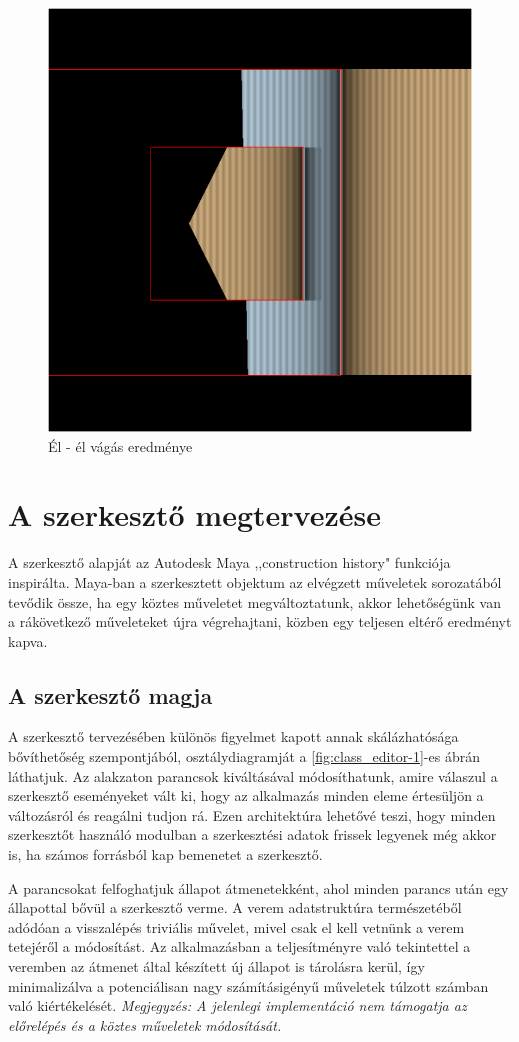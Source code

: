 \begin{figure}[H]
	\centering
	\includegraphics[width=.55\linewidth]{images/segment_segment_cut.png}
	\caption{Él - él vágás eredménye}
	\label{fig:segment_segment_cut-1}
\end{figure}

\section{A szerkesztő megtervezése}
A szerkesztő alapját az Autodesk Maya ,,construction history" funkciója inspirálta. Maya-ban a szerkesztett objektum az elvégzett műveletek sorozatából tevődik össze, ha egy köztes műveletet megváltoztatunk, akkor lehetőségünk van a rákövetkező műveleteket újra végrehajtani, közben egy teljesen eltérő eredményt kapva.

\subsection{A szerkesztő magja}

A szerkesztő tervezésében különös figyelmet kapott annak skálázhatósága bővíthetőség szempontjából, osztálydiagramját a \ref{fig:class_editor-1}-es ábrán láthatjuk. Az alakzaton parancsok kiváltásával módosíthatunk, amire válaszul a szerkesztő eseményeket vált ki, hogy az alkalmazás minden eleme értesüljön a változásról és reagálni tudjon rá. Ezen architektúra lehetővé teszi, hogy minden szerkesztőt használó modulban a szerkesztési adatok frissek legyenek még akkor is, ha számos forrásból kap bemenetet a szerkesztő.

A parancsokat felfoghatjuk állapot átmenetekként, ahol minden parancs után egy állapottal bővül a szerkesztő verme. A verem adatstruktúra természetéből adódóan a visszalépés triviális művelet, mivel csak el kell vetnünk a verem tetejéről a módosítást. Az alkalmazásban a teljesítményre való tekintettel a veremben az átmenet által készített új állapot is tárolásra kerül, így minimalizálva a potenciálisan nagy számításigényű műveletek túlzott számban való kiértékelését. \textit{Megjegyzés: A jelenlegi implementáció nem támogatja az előrelépés és a köztes műveletek módosítását.}

